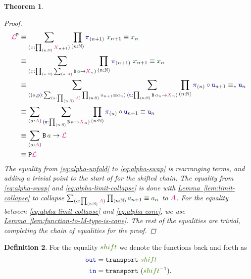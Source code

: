 \documentclass[twoside,11pt,openright]{report}
\theoremstyle{plain} %
\newtheorem{thm}{Theorem}[section]
\theoremstyle{definition}
\newtheorem{defn}[thm]{Definition}%
\theoremstyle{remark}
\newcommand*{\lemref}[1]{\hyperref[lem:#1]{Lemma~\ref*{lem:#1}}}
\newcommand*{\term}[1]{\textcolor{green!30!black}{#1}} %
\newcommand*{\pathterm}[1]{\textcolor{green!65!red!75!black}{#1}}
\newcommand*{\type}[1]{\textcolor{magenta!90!black}{#1}}
\newcommand*{\function}[1]{\textcolor{blue!60!black}{\ensuremath{\mathtt{#1}}}}
\newcommand*{\typeformer}[1]{\ensuremath{\mathtt{#1}}}
\newcommand*{\functor}[1]{\ensuremath{\mathbf{\mathtt{#1}}}}
\newcommand*{\sym}[1]{\ensuremath{#1^{-1}}}
\begin{document}
\begin{thm}
\begin{proof}
    \begin{align}
      \type{\mathcal{L}}^{\functor{P}} &\equiv \sum_{(\term{x} : \prod_{(n : \mathbb{N})} \type{X}_{n+1})} \prod_{(n : \mathbb{N})} \function{\pi}_{(n+1)}~\term{x}_{n+1} \equiv \term{x}_{n} \\
      &\equiv \sum_{(\term{x} : \prod_{(n : \mathbb{N})} \sum_{(\term{a} : \type{A})} \typeformer{B}\,\term{a} \rightarrow \type{X}_n)} \prod_{(n : \mathbb{N})} \function{\pi}_{(n+1)}~\term{x}_{n+1} \equiv \term{x}_{n} \label{eq:alpha-unfold}\\
      &\equiv \sum_{((\term{a} , \function{p}) : \sum_{(\term{a} : \prod_{(n : \mathbb{N})} \type{A})} \prod_{(n : \mathbb{N})} \term{a}_{n+1} \equiv \term{a}_n)} \sum_{(\function{u} : \prod_{(n : \mathbb{N})} \typeformer{B}\,\term{a}_n \rightarrow \type{X}_n)} \prod_{(n : \mathbb{N})} \function{\pi}_{(n)} \circ \function{u}_{n+1} \equiv_* \function{u}_n \label{eq:alpha-swap} \\
      &\equiv \sum_{(\term{a} : \type{A})} \sum_{(\function{u} : \prod_{(n : \mathbb{N})} \typeformer{B}\,a \rightarrow \type{X}_n)} \prod_{(n : \mathbb{N})} \function{\pi}_{(n)} \circ \function{u}_{n+1} \equiv \function{u}_n \label{eq:alpha-limit-collapse} \\
      &\equiv \sum_{(\term{a} : \type{A})} \typeformer{B}\,\term{a} \rightarrow \type{\mathcal{L}} \label{eq:alpha-cone}\\
      &\equiv \functor{P}\type{\mathcal{L}}
    \end{align}
    The equality from \eqref{eq:alpha-unfold} to \eqref{eq:alpha-swap} is rearranging terms, and adding a trivial point to the start of for the shifted chain. The equality from \eqref{eq:alpha-swap} and \eqref{eq:alpha-limit-collapse} is done with \lemref{limit-collapse} to collapse \(\sum_{(\term{a} : \prod_{(n : \mathbb{N})} \type{A})} \prod_{(n : \mathbb{N})} \term{a}_{n+1} \equiv \term{a}_n\) to \(\type{A}\). For the equality between \eqref{eq:alpha-limit-collapse} and \eqref{eq:alpha-cone}, we use \lemref{function-to-M-type-is-cone}. The rest of the equalities are trivial, completing the chain of equalities for the proof.
  \end{proof}
\end{thm}
\begin{defn}
  For the equality \(\pathterm{shift}\) we denote the functions back and forth as
  \begin{align}
    \function{out} &= \mathtt{transport}~\pathterm{shift} \\
    \function{in} &= \mathtt{transport}~(\sym{\pathterm{shift}}).
  \end{align}
\end{defn}
\end{document}
